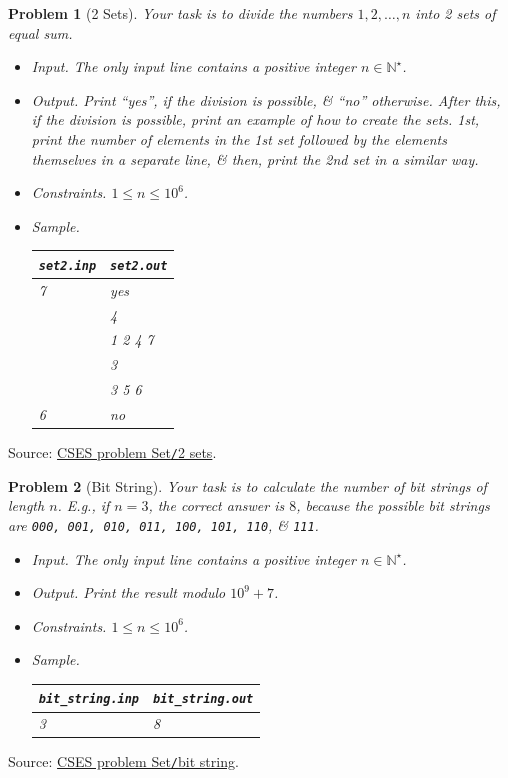 \documentclass{article}
\newtheorem{problem}{Problem}
\begin{document}
\begin{problem}[2 Sets]
	Your task is to divide the numbers $1,2,\ldots,n$ into 2 sets of equal sum.
	\begin{itemize}
		\item {\sf Input.} The only input line contains a positive integer $n\in\mathbb{N}^\star$.
		\item {\sf Output.} Print ``yes'', if the division is possible, \& ``no'' otherwise. After this, if the division is possible, print an example of how to create the sets. 1st, print the number of elements in the 1st set followed by the elements themselves in a separate line, \& then, print the 2nd set in a similar way.
		\item {\sf Constraints.} $1\le n\le10^6$.
		\item {\sf Sample.}
		\begin{table}[H]
			\centering
			\begin{tabular}{|l|l|}
				\hline
				\verb|set2.inp| & \verb|set2.out| \\
				\hline
				7 & yes \\
				& 4 \\
				& 1 2 4 7 \\
				& 3 \\
				& 3 5 6 \\
				\hline
				6 & no \\
				\hline
			\end{tabular}
		\end{table}
	\end{itemize}
\end{problem}
Source: \href{https://cses.fi/problemset/task/1092}{CSES problem Set{\tt/}2 sets}.

\begin{problem}[Bit String]
	Your task is to calculate the number of bit strings of length $n$. E.g., if $n = 3$, the correct answer is $8$, because the possible bit strings are {\tt000, 001, 010, 011, 100, 101, 110}, \& {\tt111}.
	\begin{itemize}
		\item {\sf Input.} The only input line contains a positive integer $n\in\mathbb{N}^\star$.
		\item {\sf Output.} Print the result modulo $10^9 + 7$.
		\item {\sf Constraints.} $1\le n\le10^6$.
		\item {\sf Sample.}
		\begin{table}[H]
			\centering
			\begin{tabular}{|l|l|}
				\hline
				\verb|bit_string.inp| & \verb|bit_string.out| \\
				\hline
				3 & 8 \\
				\hline
			\end{tabular}
		\end{table}
	\end{itemize}
\end{problem}
Source: \href{https://cses.fi/problemset/task/1617}{CSES problem Set{\tt/}bit string}.
\end{document}
